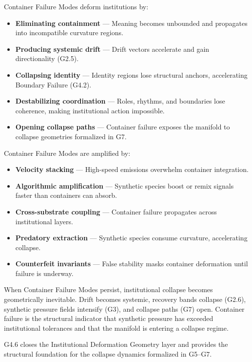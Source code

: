\noindent Container Failure Modes deform institutions by:

\begin{itemize}[leftmargin=1.2cm]
    \item \textbf{Eliminating containment} — Meaning becomes unbounded and
    propagates into incompatible curvature regions.

    \item \textbf{Producing systemic drift} — Drift vectors accelerate and gain
    directionality (G2.5).

    \item \textbf{Collapsing identity} — Identity regions lose structural
    anchors, accelerating Boundary Failure (G4.2).

    \item \textbf{Destabilizing coordination} — Roles, rhythms, and boundaries
    lose coherence, making institutional action impossible.

    \item \textbf{Opening collapse paths} — Container failure exposes the
    manifold to collapse geometries formalized in G7.
\end{itemize}

\medskip

\noindent Container Failure Modes are amplified by:

\begin{itemize}[leftmargin=1.2cm]
    \item \textbf{Velocity stacking} — High-speed emissions overwhelm container
    integration.

    \item \textbf{Algorithmic amplification} — Synthetic species boost or remix
    signals faster than containers can absorb.

    \item \textbf{Cross-substrate coupling} — Container failure propagates across
    institutional layers.

    \item \textbf{Predatory extraction} — Synthetic species consume curvature,
    accelerating collapse.

    \item \textbf{Counterfeit invariants} — False stability masks container
    deformation until failure is underway.
\end{itemize}

\medskip

\noindent When Container Failure Modes persist, institutional collapse becomes
geometrically inevitable. Drift becomes systemic, recovery bands collapse
(G2.6), synthetic pressure fields intensify (G3), and collapse paths (G7) open.
Container failure is the structural indicator that synthetic pressure has
exceeded institutional tolerances and that the manifold is entering a collapse
regime.

\medskip

\noindent G4.6 closes the Institutional Deformation Geometry layer and provides
the structural foundation for the collapse dynamics formalized in G5--G7.
